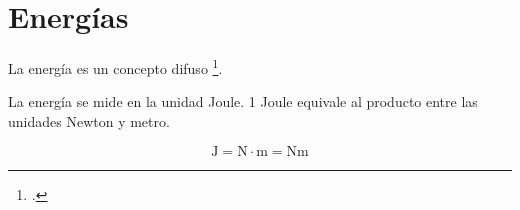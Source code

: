 \documentclass[../principal.tex]{subfiles}
\begin{document}
\chapter{Energías}

La energía es un concepto difuso \footcite{hewitt_fisica_2007}.

La energía se mide en la unidad Joule. 1 Joule equivale al producto entre las unidades Newton y metro.

\begin{equation}
  \unit{\joule} = \unit{\newton} \cdot \unit{\metre} = \unit{\newton\metre}
\end{equation}


\newpage
\end{document}
